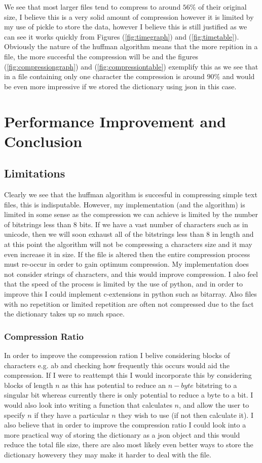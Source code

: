 \documentclass{mm2}
\begin{document}
We see that most larger files tend to compress to around $56\%$ of their original size, I believe this is a very solid amount of compression however it is limited by my use of pickle to store the data, however I believe this is still justified as we can see it works quickly from Figures (\ref{fig:timegraph}) and (\ref{fig:timetable}). Obviously the nature of the huffman algorithm means that the more repition in a file, the more succesful the compression will be and the figures (\ref{fig:compressiongraph}) and (\ref{fig:compressiontable}) exemplify this as we see that in a file containing only one character the compression is around $90\%$ and would be even more impressive if we stored the dictionary using json in this case.

\section{Performance Improvement and Conclusion}
\subsection{Limitations}
Clearly we see that the huffman algorithm is succesful in compressing simple text files, this is indisputable. However, my implementation (and the algorithm) is limited in some sense as the compression we can achieve is limited by the number of bitstrings less than 8 bits. If we have a vast number of characters such as in unicode, then we will soon exhaust all of the bitstrings less than 8 in length and at this point the algorithm will not be compressing a characters size and it may even increase it in size. If the file is altered then the entire compression process must re-occur in order to gain optimum compression. My implementation does not consider strings of characters, and this would improve compression. I also feel that the speed of the process is limited by the use of python, and in order to improve this I could implement c-extensions in python such as bitarray. Also files with no repetition or limited repetition are often not compressed due to the fact the dictionary takes up so much space.
\subsubsection{Compression Ratio}
In order to improve the compression ration I belive considering blocks of characters e.g. ab and checking how frequently this occurs would aid the compression. If I were to reattempt this I would incorporate this by considering blocks of length $n$ as this has potential to reduce an $n-byte$ bitstring to a singular bit whereas currently there is only potential to reduce a byte to a bit. I would also look into writing a function that calculates $n$, and allow the user to specify $n$ if they have a particular $n$ they wish to use (if not then calculate it). I also believe that in order to improve the compression ratio I could look into a more practical way of storing the dictionary as a json object and this would reduce the total file size, there are also most likely even better ways to store the dictionary howevery they may make it harder to deal with the file.
\end{document}
